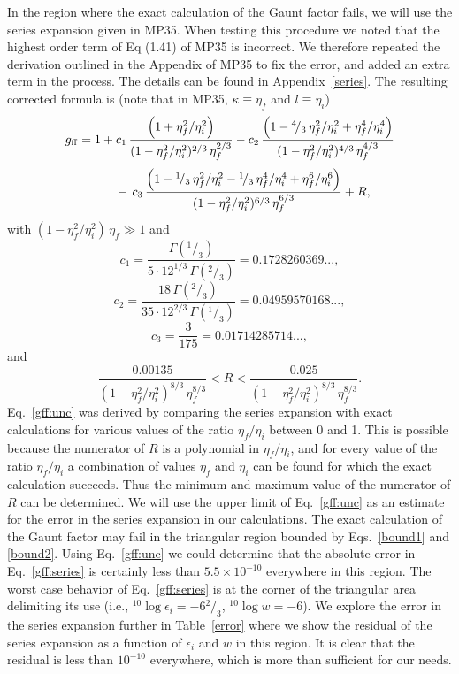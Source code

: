 \documentclass[useAMS,usenatbib]{mn2e}
\def\rfrac#1#2{{}^{#1}\!/_{#2}}
\begin{document}
In the region where the exact calculation of the Gaunt factor fails, we will
use the series expansion given in MP35. When testing this procedure we noted
that the highest order term of Eq (1.41) of MP35 is incorrect. We therefore
repeated the derivation outlined in the Appendix of MP35 to fix the error, and
added an extra term in the process. The details can be found in
Appendix~\ref{series}. The resulting corrected formula is (note that in MP35,
$\kappa \equiv \eta_f$ and $l \equiv \eta_i$)
\[ g_{\rm ff} = 1 + c_1 \, \frac{\left(1 + \eta_f^2/\eta_i^2\right)}{(1 - \eta_f^2/\eta_i^2)^{2/3} \, \eta_f^{2/3}} -
c_2 \, \frac{\left(1 - \rfrac{4}{3}\,\eta_f^2/\eta_i^2 + \eta_f^4/\eta_i^4\right)}
{(1 - \eta_f^2/\eta_i^2)^{4/3} \, \eta_f^{4/3}} \]
\begin{equation}
\label{gff:series}
\phantom{g_{\rm ff} =} - \, c_3 \, \frac{\left(1 - \rfrac{1}{3}\,\eta_f^2/\eta_i^2 - \rfrac{1}{3}\,\eta_f^4/\eta_i^4 +
\eta_f^6/\eta_i^6\right)}{(1 - \eta_f^2/\eta_i^2)^{6/3} \, \eta_f^{6/3}} + R,
\end{equation}
with $(1 - \eta_f^2/\eta_i^2) \, \eta_f \gg 1$ and
\[ c_1 = \frac{\Gamma(\rfrac{1}{3})}{5 \cdot 12^{1/3} \, \Gamma(\rfrac{2}{3})} = 0.1728260369..., \]
\[ c_2 = \frac{18 \, \Gamma(\rfrac{2}{3})}{35 \cdot 12^{2/3} \, \Gamma(\rfrac{1}{3})} = 0.04959570168..., \]
\[ c_3 = \frac{3}{175} = 0.01714285714..., \]
and
\begin{equation}
\label{gff:unc}
\frac{0.00135}{(1 - \eta_f^2/\eta_i^2)^{8/3} \, \eta_f^{8/3}} < R < \frac{0.025}{(1 - \eta_f^2/\eta_i^2)^{8/3} \, \eta_f^{8/3}}.
\end{equation}
Eq.~\ref{gff:unc} was derived by comparing the series expansion with exact
calculations for various values of the ratio $\eta_f/\eta_i$ between 0 and 1.
This is possible because the numerator of $R$ is a polynomial in
$\eta_f/\eta_i$, and for every value of the ratio $\eta_f/\eta_i$ a
combination of values $\eta_f$ and $\eta_i$ can be found for which the exact
calculation succeeds. Thus the minimum and maximum value of the numerator of
$R$ can be determined. We will use the upper limit of Eq.~\ref{gff:unc} as an
estimate for the error in the series expansion in our calculations. The exact
calculation of the Gaunt factor may fail in the triangular region bounded by
Eqs.~\ref{bound1} and \ref{bound2}. Using Eq.~\ref{gff:unc} we could determine
that the absolute error in Eq.~\ref{gff:series} is certainly less than
$5.5\times10^{-10}$ everywhere in this region. The worst case behavior of
Eq.~\ref{gff:series} is at the corner of the triangular area delimiting its
use (i.e., ${}^{10}\log \epsilon_i = -6\rfrac{2}{3}$, ${}^{10}\log w = -6$).
We explore the error in the series expansion further in Table~\ref{error}
where we show the residual of the series expansion as a function of
$\epsilon_i$ and $w$ in this region. It is clear that the residual is less
than $10^{-10}$ everywhere, which is more than sufficient for our needs.
\end{document}
